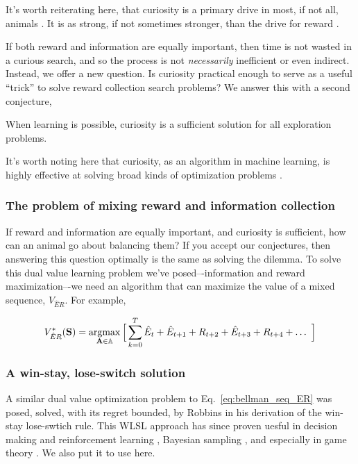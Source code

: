 It's worth reiterating here, that curiosity is a primary drive in most, if not all, animals \cite{Inglis2001}. It is as strong, if not sometimes stronger, than the drive for reward \cite{Loewenstein1994,Kidd2015,Gottlieb2018}.

If both reward and information are equally important, then time is not wasted in a curious search, and so the process is not \textit{necessarily} inefficient or even indirect. Instead, we offer a new question. Is curiosity practical enough to serve as a useful ``trick'' to solve reward collection search problems? We answer this with a second conjecture,

\begin{conjecture}
	When learning is possible, curiosity is a sufficient solution for all exploration problems.
\end{conjecture}

It's worth noting here that curiosity, as an algorithm in machine learning, is highly effective at solving broad kinds of optimization problems \cite{Schmidhuber1991,Stanton2018,Lehman2010,Mouret2011,Fister2019,Mouret2015,Colas2020,Cully2015,Pathak2017,Laversanne-Finot2018}. 

\subsubsection*{The problem of mixing reward and information collection}
If reward and information are equally important, and curiosity is sufficient, how can an animal go about balancing them? If you accept our conjectures, then answering this question optimally is the same as solving the dilemma. To solve this dual value learning problem we’ve posed–-information and reward maximization–-we need an algorithm that can maximize the value of a mixed sequence, $V_{\hat{E}R}$. For example,

\begin{equation}
	\label{eq:bellman_seq_ER}
	V^*_{\hat{E}R}(\mathbf{S}) = \operatorname*{argmax}_{\mathbf{A} \in \mathbb{A}} \Big [\sum_{k=0}^{T} \hat{E}_t + \hat{E}_{t+1} + R_{t+2} + \hat{E}_{t+3} + R_{t+4} + \ldots  \ \Big ]
\end{equation}

\subsubsection*{A win-stay, lose-switch solution}
A similar dual value optimization problem to Eq.~\ref{eq:bellman_seq_ER} was posed, solved, with its regret bounded, by Robbins \cite{Robbins1952} in his derivation of the win-stay lose-swtich rule. This WLSL approach has since proven uesful in decision making and reinforcement learning \cite{Estes1994TowardAS,Worthy2014}, Bayesian sampling \cite{Bonawitz2014}, and especially in game theory \cite{Nowak1993}. We also put it to use here. 

